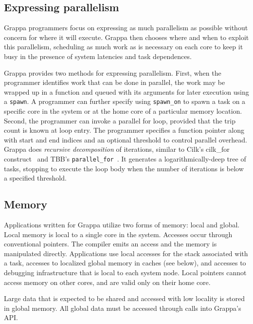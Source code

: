 \subsection{Expressing parallelism}

Grappa programmers focus on expressing as much parallelism as possible without concern for where it will execute. Grappa then chooses where and when to exploit this parallelism, scheduling as much work as is necessary on each core to keep it busy in the presence of system latencies and task dependences.

Grappa provides two methods for expressing parallelism. First, when the programmer identifies work that can be done in parallel, the work may be wrapped up in a function and queued with its arguments for later execution using a \texttt{spawn}. A programmer can further specify using \texttt{spawn\_on} to spawn a task on a specific core in the system or at the home core of a particular memory location. Second, the programmer can invoke a parallel for loop, provided that the trip count is known at loop entry. The programmer specifies a function pointer along with start and end indices and an optional threshold to control parallel overhead. Grappa does {\em recursive decomposition} of iterations, similar to Cilk's cilk\_for construct~\cite {cilkforimplementation} and TBB's {\tt parallel\_for}~\cite{intel_tbb}.  It generates a logarithmically-deep tree of tasks, stopping to execute the loop body when the number of iterations is below a specified threshold.

\subsection{Memory}

Applications written for Grappa utilize two forms of memory: local and global.  Local memory is local to a single core in the system.  Accesses occur through conventional pointers.  The compiler emits an access and the memory is manipulated directly.  Applications use local accesses for the stack associated with a task, accesses to localized global memory in caches (see below), and accesses to debugging infrastructure that is local to each system node.  Local pointers cannot access memory on other cores, and are valid only on their home core.

Large data that is expected to be shared and accessed with low locality is stored in global memory. All global data must be accessed through calls into Grappa's API. %

